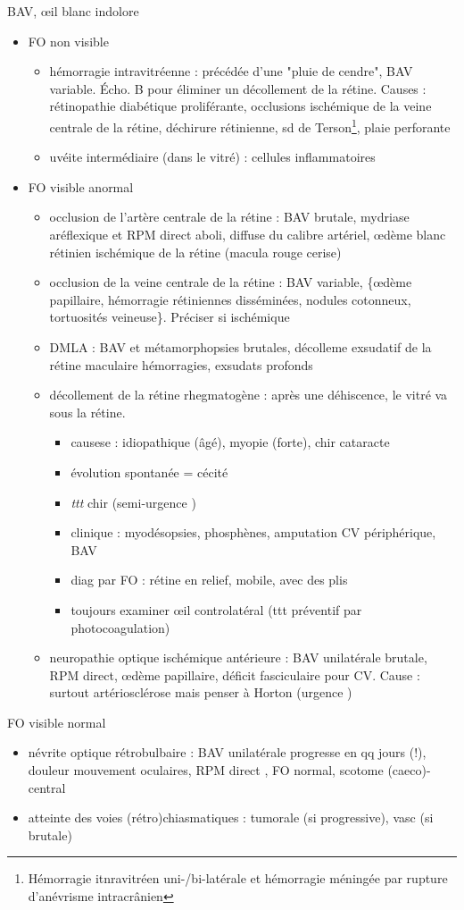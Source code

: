 \documentclass[11pt]{article}
\begin{document}
BAV, \oe{}il blanc indolore
\begin{itemize}
\item FO non visible 
\begin{itemize}
\item hémorragie intravitréenne : précédée d'une "pluie de cendre", BAV
variable. Écho. B pour éliminer un décollement de la rétine. Causes :
rétinopathie diabétique proliférante, occlusions ischémique de la veine
centrale de la rétine, déchirure rétinienne, sd de Terson\footnote{Hémorragie itnravitréen uni-/bi-latérale et hémorragie méningée par
rupture d'anévrisme intracrânien}, plaie
perforante
\item uvéite intermédiaire (dans le vitré) : cellules inflammatoires
\end{itemize}
\item FO visible anormal
\begin{itemize}
\item occlusion de l'artère centrale de la rétine : BAV brutale, mydriase
aréflexique et RPM direct aboli, \dec diffuse du calibre artériel, \oe{}dème
blanc rétinien ischémique de la rétine (macula rouge cerise)
\item occlusion de la veine centrale de la rétine : BAV variable, \{\oe{}dème
papillaire, hémorragie rétiniennes disséminées, nodules cotonneux,
tortuosités veineuse\}. Préciser si ischémique
\item DMLA : BAV et métamorphopsies brutales, décolleme exsudatif de la rétine
maculaire \textpm{} hémorragies, exsudats profonds
\item décollement de la rétine rhegmatogène : après une déhiscence, le vitré va
sous la rétine. 
\begin{itemize}
\item causese : idiopathique (âgé), myopie (forte), chir cataracte
\item évolution spontanée = cécité
\item \emph{ttt} chir (semi-urgence \danger)
\item clinique : myodésopsies, phosphènes, amputation CV périphérique, BAV
\item diag par FO : rétine en relief, mobile, avec des plis
\item toujours examiner \oe{}il controlatéral (ttt préventif par photocoagulation)
\danger
\end{itemize}
\item neuropathie optique ischémique antérieure : BAV unilatérale brutale, \dec
RPM direct, \oe{}dème papillaire, déficit fasciculaire pour CV. Cause : surtout
artériosclérose mais penser à Horton (urgence \skull)
\end{itemize}
\end{itemize}
FO visible normal
\begin{itemize}
\item névrite optique rétrobulbaire : BAV unilatérale progresse en qq jours (!),
douleur \inc mouvement oculaires, RPM direct \dec, FO normal, scotome
(caeco)-central
\item atteinte des voies (rétro)chiasmatiques : tumorale (si progressive), vasc (si brutale)
\end{itemize}
\end{document}
